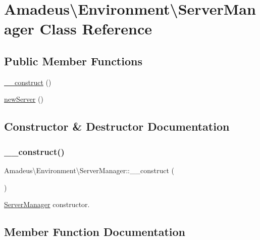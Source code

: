 \hypertarget{classAmadeus_1_1Environment_1_1ServerManager}{}\section{Amadeus\textbackslash{}Environment\textbackslash{}Server\+Manager Class Reference}
\label{classAmadeus_1_1Environment_1_1ServerManager}
\subsection*{Public Member Functions}
\begin{DoxyCompactItemize}
\item 
\hyperlink{classAmadeus_1_1Environment_1_1ServerManager_a033da04a5b4168e2859bb605666b6bcd}{\+\_\+\+\_\+construct} ()
\item 
\hyperlink{classAmadeus_1_1Environment_1_1ServerManager_a731323f507ef1f33ae3976c029843222}{new\+Server} ()
\end{DoxyCompactItemize}


\subsection{Constructor \& Destructor Documentation}
\mbox{\label{classAmadeus_1_1Environment_1_1ServerManager_a033da04a5b4168e2859bb605666b6bcd}} 
\subsubsection{\texorpdfstring{\+\_\+\+\_\+construct()}{\_\_construct()}}
{\footnotesize\ttfamily Amadeus\textbackslash{}\+Environment\textbackslash{}\+Server\+Manager\+::\+\_\+\+\_\+construct (\begin{DoxyParamCaption}{ }\end{DoxyParamCaption})}

\hyperlink{classAmadeus_1_1Environment_1_1ServerManager}{Server\+Manager} constructor. 

\subsection{Member Function Documentation}
\mbox{\label{classAmadeus_1_1Environment_1_1ServerManager_a731323f507ef1f33ae3976c029843222}} 
